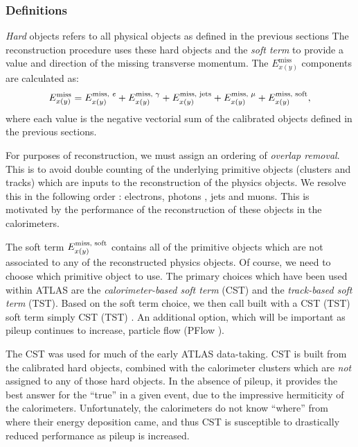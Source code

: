 \subsubsection{\met Definitions}

\textit{Hard} objects refers to all physical objects as defined in the previous sections
The \met reconstruction procedure uses these hard objects and the \textit{soft term} to provide a value and direction of the missing transverse momentum.
The $E^{\text{miss}}_{x(y)}$ components are calculated as:
\begin{equation}
  \Emiss{x(y)} = \Emisscomp{x(y)}{\text{\textit{e}}}
               + \Emisscomp{x(y)}{\gamma}
               + \Emisscomp{x(y)}{\text{jets}}
               + \Emisscomp{x(y)}{\mu}
               + \Emisscomp{x(y)}{\text{soft}},
  \label{eq:met-sum}
\end{equation}
where each value  is the negative vectorial sum of the calibrated objects defined in the previous sections.

For purposes of \met reconstruction, we must assign an ordering of \textit{overlap removal}.
This is to avoid double counting of the underlying primitive objects (clusters and tracks) which are inputs to the reconstruction of the physics objects.
We resolve this in the following order : electrons, photons , jets and muons.
This is motivated by the performance of the reconstruction of these objects in the calorimeters.

The soft term $\Emisscomp{x(y)}{\text{soft}}$ contains all of the primitive objects which are not associated to any of the reconstructed physics objects.
Of course, we need to choose which primitive object to use.
The primary choices which have been used within ATLAS are the \textit{ calorimeter-based soft term} (CST) and the \textit{track-based soft term} (TST).
Based on the soft term choice, we then call \met built with a CST (TST) soft term simply CST (TST) \met.
An additional option, which will be important as pileup continues to increase, particle flow \met (PFlow \met).

The CST \met was used for much of the early ATLAS data-taking.
CST \met is built from the calibrated hard objects, combined with the calorimeter clusters which are \textit{not} assigned to any of those hard objects.
In the absence of pileup, it provides the best answer for the ``true'' \met in a given event, due to the impressive hermiticity of the calorimeters.
Unfortunately, the calorimeters do not know ``where'' from where their energy deposition came, and thus CST is susceptible to drastically reduced performance as pileup is increased.


